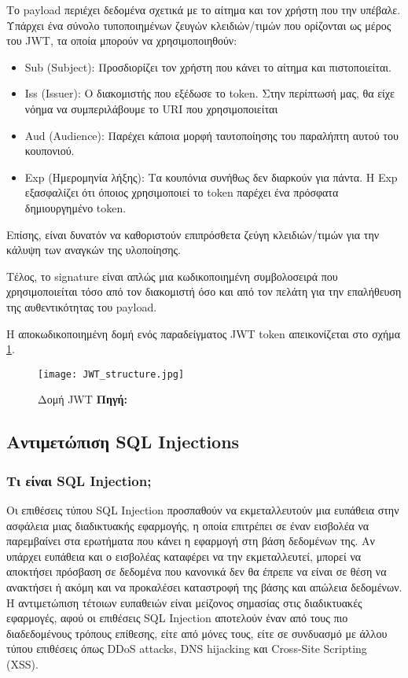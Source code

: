 Το payload περιέχει δεδομένα σχετικά με το αίτημα και τον χρήστη που την υπέβαλε. Υπάρχει ένα σύνολο τυποποιημένων ζευγών κλειδιών/τιμών που ορίζονται ως μέρος του JWT, τα οποία μπορούν να χρησιμοποιηθούν:
\begin{itemize}
  \item Sub (Subject): Προσδιορίζει τον χρήστη που κάνει το αίτημα και πιστοποιείται.
  \item Iss (Issuer): Ο διακομιστής που εξέδωσε το token. Στην περίπτωσή μας, θα είχε νόημα να συμπεριλάβουμε το URI που χρησιμοποιείται
  \item Aud (Audience): Παρέχει κάποια μορφή ταυτοποίησης του παραλήπτη αυτού του κουπονιού.
  \item Exp (Ημερομηνία λήξης): Τα κουπόνια συνήθως δεν διαρκούν για πάντα. Η Exp εξασφαλίζει ότι όποιος χρησιμοποιεί το token παρέχει ένα πρόσφατα δημιουργημένο token.
\end{itemize}
Επίσης, είναι δυνατόν να καθοριστούν επιπρόσθετα ζεύγη κλειδιών/τιμών για την κάλυψη των αναγκών της υλοποίησης.

Τέλος, το signature είναι απλώς μια κωδικοποιημένη συμβολοσειρά που χρησιμοποιείται τόσο από τον διακομιστή όσο και από τον πελάτη για την επαλήθευση της αυθεντικότητας του payload.

Η αποκωδικοποιημένη δομή ενός παραδείγματος JWT token απεικονίζεται στο σχήμα \ref{fig:JWT_structure}.

\begin{figure}[h]
	\centering
	\texttt{[image: JWT\_structure.jpg]}
	\caption[{Δομή JWT}]{Δομή JWT \textbf{Πηγή:} \cite{fig_JWT_structure}}
	\label{fig:JWT_structure}
\end{figure}

\subsection{Αντιμετώπιση SQL Injections}
\subsubsection{Τι είναι SQL Injection;}
Οι επιθέσεις τύπου SQL Injection προσπαθούν να εκμεταλλευτούν μια ευπάθεια στην ασφάλεια μιας διαδικτυακής εφαρμογής, η οποία επιτρέπει σε έναν εισβολέα να παρεμβαίνει στα ερωτήματα που κάνει η εφαρμογή στη βάση δεδομένων της. Αν υπάρχει ευπάθεια και ο εισβολέας καταφέρει να την εκμεταλλευτεί, μπορεί να αποκτήσει πρόσβαση σε δεδομένα που κανονικά δεν θα έπρεπε να είναι σε θέση να ανακτήσει ή ακόμη και να προκαλέσει καταστροφή της βάσης και απώλεια δεδομένων. Η αντιμετώπιση τέτοιων ευπαθειών είναι μείζονος σημασίας στις διαδικτυακές εφαρμογές, αφού οι επιθέσεις SQL Injection αποτελούν έναν από τους πιο διαδεδομένους τρόπους επίθεσης, είτε από μόνες τους, είτε σε συνδυασμό με άλλου τύπου επιθέσεις όπως DDoS attacks, DNS hijacking και Cross-Site Scripting (XSS).

